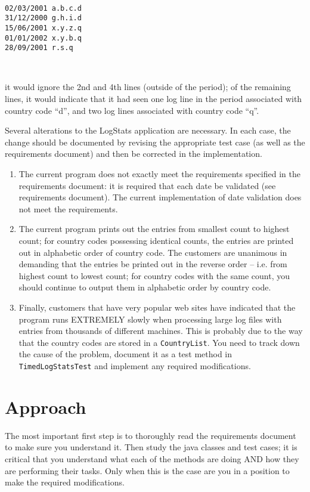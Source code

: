 \documentclass[12pt,a4paper]{article}
\begin{document}
\

\begin{verbatim}
02/03/2001 a.b.c.d
31/12/2000 g.h.i.d
15/06/2001 x.y.z.q
01/01/2002 x.y.b.q
28/09/2001 r.s.q
\end{verbatim}

\

it would ignore the 2nd and 4th lines (outside of the period); of the
remaining lines, it would indicate that it had seen one log line in
the period associated with country code ``d'', and two log lines
associated with country code ``q''.

Several alterations to the LogStats application are necessary. In each
case, the change should be documented by revising the appropriate test
case (as well as the requirements document) and then be corrected in
the implementation.

\begin{enumerate}
\item The current program does not exactly meet the requirements
  specified in the requirements document: it is required that each
  date be validated (see requirements document).  The current
  implementation of date validation does not meet the requirements.
\item The current program prints out the entries from smallest count
  to highest count; for country codes possessing identical counts, the
  entries are printed out in alphabetic order of country code.  The
  customers are unanimous in demanding that the entries be printed out
  in the reverse order – i.e. from highest count to lowest count; for
  country codes with the same count, you should continue to output
  them in alphabetic order by country code.
\item Finally, customers that have very popular web sites have
  indicated that the program runs EXTREMELY slowly when processing
  large log files with entries from thousands of different machines.
  This is probably due to the way that the country codes are stored in
  a \lstinline!CountryList!.  You need to track down the cause of the
  problem, document it as a test method in
  \lstinline!TimedLogStatsTest! and implement any required
  modifications.
\end{enumerate}

\section{Approach}

The most important first step is to thoroughly read the requirements
document to make sure you understand it.  Then study the java classes
and test cases; it is critical that you understand what each of the
methods are doing AND how they are performing their tasks.  Only when
this is the case are you in a position to make the required
modifications.
\end{document}
